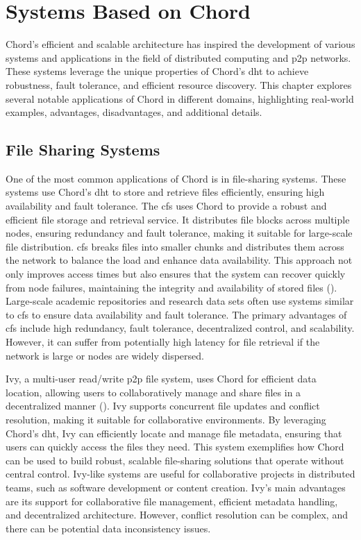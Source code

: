 \chapter{Systems Based on Chord}\label{chap:systems-based-on-chord}
Chord's efficient and scalable architecture has inspired the development of various systems and applications in the field of distributed computing and \gls{p2p} networks.
These systems leverage the unique properties of Chord's \gls{dht} to achieve robustness, fault tolerance, and efficient resource discovery.
This chapter explores several notable applications of Chord in different domains, highlighting real-world examples, advantages, disadvantages, and additional details.

\section{File Sharing Systems}
One of the most common applications of Chord is in file-sharing systems.
These systems use Chord's \gls{dht} to store and retrieve files efficiently, ensuring high availability and fault tolerance.
The \gls{cfs} uses Chord to provide a robust and efficient file storage and retrieval service.
It distributes file blocks across multiple nodes, ensuring redundancy and fault tolerance, making it suitable for large-scale file distribution.
\gls{cfs} breaks files into smaller chunks and distributes them across the network to balance the load and enhance data availability.
This approach not only improves access times but also ensures that the system can recover quickly from node failures, maintaining the integrity and availability of stored files (\cite{Dabek2001}).
Large-scale academic repositories and research data sets often use systems similar to \gls{cfs} to ensure data availability and fault tolerance.
The primary advantages of \gls{cfs} include high redundancy, fault tolerance, decentralized control, and scalability.
However, it can suffer from potentially high latency for file retrieval if the network is large or nodes are widely dispersed.

Ivy, a multi-user read/write \gls{p2p} file system, uses Chord for efficient data location, allowing users to collaboratively manage and share files in a decentralized manner (\cite{Ivy2003}).
Ivy supports concurrent file updates and conflict resolution, making it suitable for collaborative environments.
By leveraging Chord's \gls{dht}, Ivy can efficiently locate and manage file metadata, ensuring that users can quickly access the files they need.
This system exemplifies how Chord can be used to build robust, scalable file-sharing solutions that operate without central control.
Ivy-like systems are useful for collaborative projects in distributed teams, such as software development or content creation.
Ivy's main advantages are its support for collaborative file management, efficient metadata handling, and decentralized architecture.
However, conflict resolution can be complex, and there can be potential data inconsistency issues.

